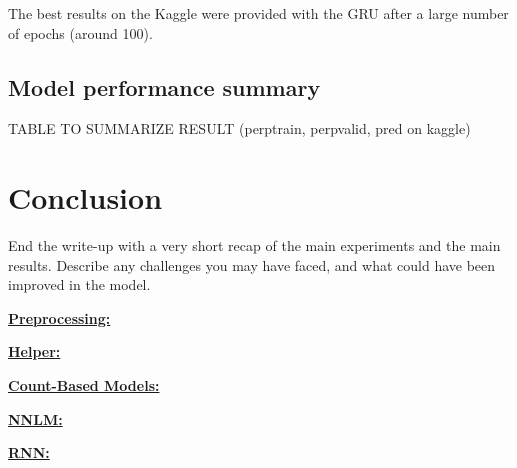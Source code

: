 \documentclass[11pt]{article}
\begin{document}
The best results on the Kaggle were provided with the GRU after a large number of epochs (around 100).


\subsection{Model performance summary}

TABLE TO SUMMARIZE RESULT (perptrain, perpvalid, pred on kaggle)


\section{Conclusion}

End the write-up with a very short recap of the main experiments and the main results. Describe any challenges you may have faced, and what could have been improved in the model.




\begin{appendices}
\textbf{\huge\underline{Preprocessing:}}

\textbf{\huge\underline{Helper:}}

\textbf{\huge\underline{Count-Based Models:}}

\textbf{\huge\underline{NNLM:}}

\textbf{\huge\underline{RNN:}}

\end{appendices}
\end{document}

